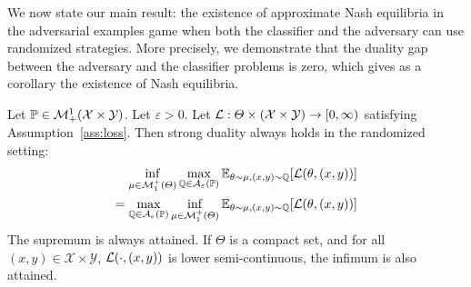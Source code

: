 



We now state our main result: the existence of approximate Nash equilibria in the adversarial examples game when both the classifier and the adversary can use randomized strategies. More precisely, we demonstrate that the duality gap between the adversary and the classifier problems is zero, which gives as a corollary the existence of Nash equilibria. 

\begin{thm}
\label{thm:duality-rand}
Let $\mathbb{P}\in\mathcal{M}^1_+(\mathcal{X}\times\mathcal{Y})$. Let $\varepsilon>0$. Let $\mathcal{L}:\Theta\times(\mathcal{X}\times\mathcal{Y})\to [0,\infty)$ satisfying Assumption~\ref{ass:loss}. %
Then strong duality always holds in the randomized  setting:
\begin{align}
 \label{eq:duality}\inf_{\mu\in \mathcal{M}^+_1(\Theta)} \max_{\QQ\in \mathcal{A}_{\varepsilon}(\PP)} \mathbb{E}_{\theta \sim \mu, (x,y)\sim\QQ }\left[\loss(\theta,(x,y))\right]\\
=
\nonumber\max_{\QQ\in \mathcal{A}_{\varepsilon}(\PP)}\inf_{\mu\in \mathcal{M}^+_1(\Theta)}  \mathbb{E}_{\theta \sim \mu, (x,y)\sim\QQ }\left[\loss(\theta,(x,y))\right]
\end{align}
The supremum is always attained. If $\Theta$ is a compact set, and for all $(x,y)\in\mathcal{X}\times\mathcal{Y}$, $\mathcal{L}(\cdot,(x,y))$ is lower semi-continuous, the infimum is also attained.
\end{thm}

